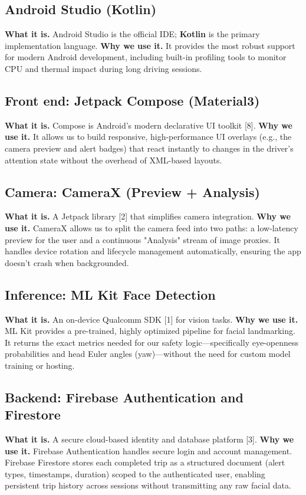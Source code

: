 \documentclass[11pt]{report}
\begin{document}
\subsection{Android Studio (Kotlin)}
\textbf{What it is.} Android Studio is the official IDE; \textbf{Kotlin} is the primary implementation language.
\textbf{Why we use it.} It provides the most robust support for modern Android development, including built-in profiling tools to monitor CPU and thermal impact during long driving sessions.

\subsection{Front end: Jetpack Compose (Material3)}
\textbf{What it is.} Compose is Android’s modern declarative UI toolkit [8].
\textbf{Why we use it.} It allows us to build responsive, high-performance UI overlays (e.g., the camera preview and alert badges) that react instantly to changes in the driver's attention state without the overhead of XML-based layouts.

\subsection{Camera: CameraX (Preview + Analysis)}
\textbf{What it is.} A Jetpack library [2] that simplifies camera integration.
\textbf{Why we use it.} CameraX allows us to split the camera feed into two paths: a low-latency preview for the user and a continuous "Analysis" stream of image proxies. It handles device rotation and lifecycle management automatically, ensuring the app doesn't crash when backgrounded.

\subsection{Inference: ML Kit Face Detection}
\textbf{What it is.} An on-device Qualcomm SDK [1] for vision tasks.
\textbf{Why we use it.} ML Kit provides a pre-trained, highly optimized pipeline for facial landmarking. It returns the exact metrics needed for our safety logic—specifically eye-openness probabilities and head Euler angles (yaw)—without the need for custom model training or hosting.

\subsection{Backend: Firebase Authentication and Firestore}
\textbf{What it is.} A secure cloud-based identity and database platform [3].
\textbf{Why we use it.} Firebase Authentication handles secure login and account management. Firebase Firestore stores each completed trip as a structured document (alert types, timestamps, duration) scoped to the authenticated user, enabling persistent trip history across sessions without transmitting any raw facial data.
\end{document}
